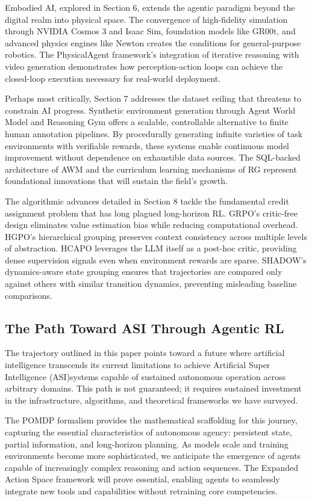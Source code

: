 Embodied AI, explored in Section 6, extends the agentic paradigm beyond the digital realm into physical space. The convergence of high-fidelity simulation through NVIDIA Cosmos 3 and Isaac Sim, foundation models like GR00t, and advanced physics engines like Newton creates the conditions for general-purpose robotics. The PhysicalAgent framework's integration of iterative reasoning with video generation demonstrates how perception-action loops can achieve the closed-loop execution necessary for real-world deployment.

Perhaps most critically, Section 7 addresses the dataset ceiling that threatens to constrain AI progress. Synthetic environment generation through Agent World Model and Reasoning Gym offers a scalable, controllable alternative to finite human annotation pipelines. By procedurally generating infinite varieties of task environments with verifiable rewards, these systems enable continuous model improvement without dependence on exhaustible data sources. The SQL-backed architecture of AWM and the curriculum learning mechanisms of RG represent foundational innovations that will sustain the field's growth.

The algorithmic advances detailed in Section 8 tackle the fundamental credit assignment problem that has long plagued long-horizon RL. GRPO's critic-free design eliminates value estimation bias while reducing computational overhead. HGPO's hierarchical grouping preserves context consistency across multiple levels of abstraction. HCAPO leverages the LLM itself as a post-hoc critic, providing dense supervision signals even when environment rewards are sparse. SHADOW's dynamics-aware state grouping ensures that trajectories are compared only against others with similar transition dynamics, preventing misleading baseline comparisons.

\subsection{The Path Toward ASI Through Agentic RL}

The trajectory outlined in this paper points toward a future where artificial intelligence transcends its current limitations to achieve Artificial Super Intelligence (ASI)systems capable of sustained autonomous operation across arbitrary domains. This path is not guaranteed; it requires sustained investment in the infrastructure, algorithms, and theoretical frameworks we have surveyed.

The POMDP formalism provides the mathematical scaffolding for this journey, capturing the essential characteristics of autonomous agency: persistent state, partial information, and long-horizon planning. As models scale and training environments become more sophisticated, we anticipate the emergence of agents capable of increasingly complex reasoning and action sequences. The Expanded Action Space framework will prove essential, enabling agents to seamlessly integrate new tools and capabilities without retraining core competencies.

